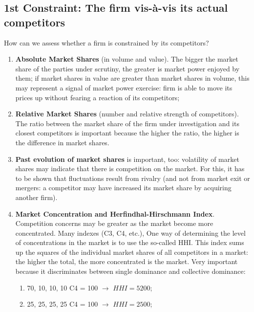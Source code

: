     \subsection{1st Constraint: The firm vis-à-vis its actual competitors}

        How can we assess whether a firm is constrained by its competitors?
        \begin{enumerate}
            \item \textbf{Absolute Market Shares} (in volume and value). The bigger the market share of the parties under scrutiny, the greater is market power enjoyed by them; if market shares in value are greater than market shares in volume, this may represent a signal of market power exercise: firm is able to move its prices up without fearing a reaction of its competitors;
            \item \textbf{Relative Market Shares} (number and relative strength of competitors). The ratio between the market share of the firm under investigation and its closest competitors is important because the higher the ratio, the higher is the difference in market shares.
            \item \textbf{Past evolution of market shares} is important, too: volatility of market shares may indicate that there is competition on the market. For this, it has to be shown that fluctuations result from rivalry (and not from market exit or mergers: a competitor may have increased its market share by acquiring another firm).
            \item \textbf{Market Concentration and Herfindhal-Hirschmann Index}. Competition concerns may be greater as the market become more concentrated. Many indexes (C3, C4, etc.), One way of determining the level of concentrations in the market is to use the so-called HHI. This index sums up the squares of the individual market shares of all competitors in a market: the higher the total, the more concentrated is the market. Very important because it discriminates between single dominance and collective dominance:
                \begin{enumerate}
                    \item 70, 10, 10, 10 C4 = 100 \(\rightarrow\) $HHI = 5200$;
                    \item 25, 25, 25, 25 C4 = 100 \(\rightarrow\) $HHI = 2500$;
                \end{enumerate}
\end{enumerate}
